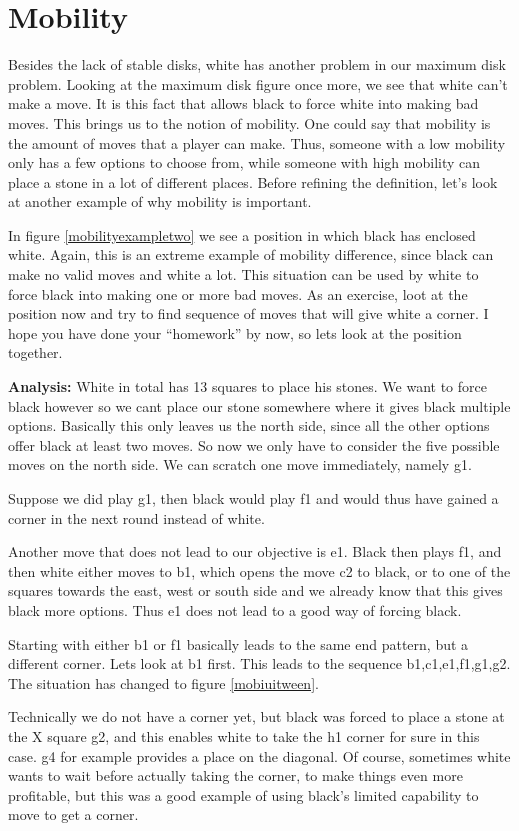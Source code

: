 \documentclass[12pt,twoside]{report}
\begin{document}
\section{Mobility}
Besides the lack of stable disks, white has another problem in our
maximum disk problem. Looking at the maximum disk figure once
more, we see that white can't make a move. It is this fact that
allows black to force white into making bad moves. This brings us
to the notion of mobility. One could say that mobility is the
amount of moves that a player can make. Thus, someone with a low
mobility only has a few options to choose from, while someone with
high mobility can place a stone in a lot of different places.
Before refining the definition, let's look at another example of
why mobility is important.
\begin{floatingfigure}{4cm}
\mobilityexampletwo
\end{floatingfigure}
In figure \ref{mobilityexampletwo} we
see a position in which black has enclosed white. Again, this is
an extreme example of mobility difference, since black can make no
valid moves and white a lot. This situation can be used by white
to force black into making one or more bad moves. As an exercise,
loot at the position now and try to find sequence of moves that
will give white a corner. I hope you have done your ``homework''
by now, so lets look at the position together.

\noindent\textbf{Analysis:} White in total
has 13 squares to place his stones. We want to force black however
so we cant place our stone somewhere where it gives black multiple
options. Basically this only leaves us the north side, since all
the other options offer black at least two moves. So now we only
have to consider the five possible moves on the north side. We can
scratch one move immediately, namely g1.

Suppose we did play g1,
then black would play f1 and would thus have gained a corner in
the next round instead of white.

Another move that does not lead
to our objective is e1. Black then plays f1, and then white either
moves to b1, which opens the move c2 to black, or to one of the
squares towards the east, west or south side and we already know
that this gives black more options. Thus e1 does not lead to a
good way of forcing black.

Starting with either b1 or f1 basically leads to the same end
pattern, but a different corner. Lets look at b1 first. This leads
to the sequence b1,c1,e1,f1,g1,g2. The situation has changed to
figure \ref{mobiuitween}.
\begin{figure}
\mobiuitween
\end{figure}
Technically we do not have a corner yet,
but black was forced to place a stone at the X square g2, and this
enables white to take the h1 corner for sure in this case. g4 for
example provides a place on the diagonal. Of course, sometimes
white wants to wait before actually taking the corner, to make
things even more profitable, but this was a good example of using
black's limited capability to move to get a corner.
\end{document}
